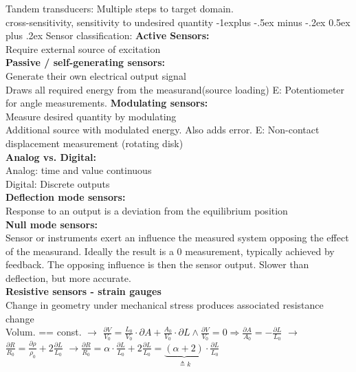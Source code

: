 \documentclass[5pt]{article}
\makeatletter
\renewcommand{\subsection}{\@startsection{subsection}{2}{0mm}%
                                {-1explus -.5ex minus -.2ex}%
                                {0.5ex plus .2ex}%
                                {\normalfont\normalsize\bfseries}}
\makeatother
\begin{document}
\begin{multicols*}{4}
Tandem transducers: Multiple steps to target domain.\\
cross-sensitivity, sensitivity to undesired quantity
\subsection{Sensor classification:}
\textbf{Active Sensors:}\\
Require external source of excitation\\
\textbf{Passive / self-generating sensors:}\\
Generate their own electrical output signal\\
Draws all required energy from the measurand(source loading)
E: Potentiometer for angle measurements.
\textbf{Modulating sensors:}\\
Measure desired quantity by modulating\\
Additional source with modulated energy. Also adds error.
E: Non-contact displacement measurement (rotating disk)\\
\textbf{Analog vs. Digital:}\\
Analog: time and value continuous\\
Digital: Discrete outputs\\
\textbf{Deflection mode sensors:}\\
Response to an output is a deviation from the equilibrium position\\
\textbf{Null mode sensors:}\\
Sensor or instruments exert an influence the measured system opposing the effect of the measurand. Ideally the result is a 0 measurement, typically achieved by feedback. The opposing influence is then the sensor output.
Slower than deflection, but more accurate.\\
\textbf{Resistive sensors - strain gauges}\\
Change in geometry under mechanical stress produces associated resistance change\\
Volum. == const. $ \rightarrow $ $ \frac{\partial V}{V_{0}}=\frac{L_{0}}{V_{0}} \cdot \partial A+\frac{A_{0}}{V_{0}} \cdot \partial L \wedge \frac{\partial V}{V_{0}}=0 \Rightarrow \frac{\partial A}{A_{0}}=-\frac{\partial L}{L_{0}}  $ $ \rightarrow $ $ \frac{\partial R}{R_{0}}=\frac{\partial \rho}{\rho_{0}}+2 \frac{\partial L}{L_{0}} $ $ \rightarrow $$ \frac{\partial R}{R_{0}}=\alpha \cdot \frac{\partial L}{L_{0}}+2 \frac{\partial L}{L_{0}}=\underbrace{(\alpha+2)}_{\triangleq k} \cdot \frac{\partial L}{L_{0}} $\\
$$
\end{multicols*}
\end{document}

